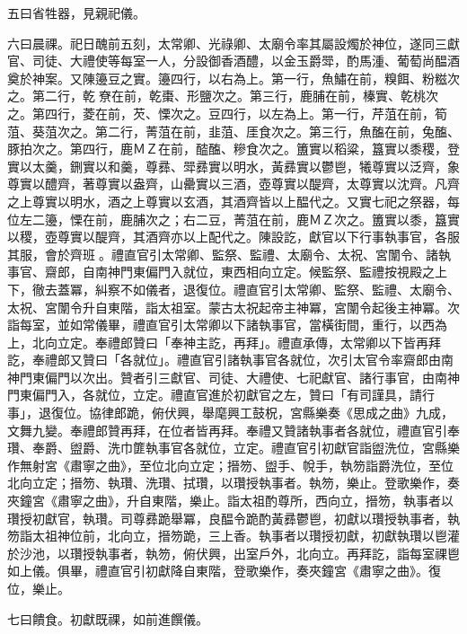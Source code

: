 \begin{pinyinscope}
 五曰省牲器，見親祀儀。



 六曰晨祼。祀日醜前五刻，太常卿、光祿卿、太廟令率其屬設燭於神位，遂同三獻官、司徒、大禮使等每室一人，分設御香酒醴，以金玉爵斝，酌馬湩、葡萄尚醖酒奠於神案。又陳籩豆之實。籩四行，以右為上。第一行，魚鱐在前，糗餌、粉糍次之。第二行，乾尞在前，乾棗、形鹽次之。第三行，鹿脯在前，榛實、乾桃次之。第四行，菱在前，芡、慄次之。豆四行，以左為上。第一行，芹菹在前，筍菹、葵菹次之。第二行，菁菹在前，韭菹、厓食次之。第三行，魚醢在前，兔醢、豚拍次之。第四行，鹿ＭＺ在前，醓醢、糝食次之。簠實以稻粱，簋實以黍稷，登實以太羹，鉶實以和羹，尊彞、斝彞實以明水，黃彞實以鬱鬯，犧尊實以泛齊，象尊實以醴齊，著尊實以盎齊，山罍實以三酒，壺尊實以醍齊，太尊實以沈齊。凡齊之上尊實以明水，酒之上尊實以玄酒，其酒齊皆以上醖代之。又實七祀之祭器，每位左二籩，慄在前，鹿脯次之；右二豆，菁菹在前，鹿ＭＺ次之。簠實以黍，簋實以稷，壺尊實以醍齊，其酒齊亦以上配代之。陳設訖，獻官以下行事執事官，各服其服，會於齊班。禮直官引太常卿、監祭、監禮、太廟令、太祝、宮闈令、諸執事官、齋郎，自南神門東偏門入就位，東西相向立定。候監祭、監禮按視殿之上下，徹去蓋冪，糾察不如儀者，退復位。禮直官引太常卿、監祭、監禮、太廟令、太祝、宮闈令升自東階，詣太祖室。蒙古太祝起帝主神冪，宮闈令起後主神冪。次詣每室，並如常儀畢，禮直官引太常卿以下諸執事官，當橫街間，重行，以西為上，北向立定。奉禮郎贊曰「奉神主訖，再拜」。禮直承傳，太常卿以下皆再拜訖，奉禮郎又贊曰「各就位」。禮直官引諸執事官各就位，次引太官令率齋郎由南神門東偏門以次出。贊者引三獻官、司徒、大禮使、七祀獻官、諸行事官，由南神門東偏門入，各就位，立定。禮直官進於初獻官之左，贊曰「有司謹具，請行事」，退復位。協律郎跪，俯伏興，舉麾興工鼓柷，宮縣樂奏《思成之曲》九成，文舞九變。奉禮郎贊再拜，在位者皆再拜。奉禮又贊諸執事者各就位，禮直官引奉瓚、奉爵、盥爵、洗巾篚執事官各就位，立定。禮直官引初獻官詣盥洗位，宮縣樂作無射宮《肅寧之曲》，至位北向立定；搢笏、盥手、帨手，執笏詣爵洗位，至位北向立定；搢笏、執瓚、洗瓚、拭瓚，以瓚授執事者。執笏，樂止。登歌樂作，奏夾鐘宮《肅寧之曲》，升自東階，樂止。詣太祖酌尊所，西向立，搢笏，執事者以瓚授初獻官，執瓚。司尊彞跪舉冪，良醖令跪酌黃彞鬱鬯，初獻以瓚授執事者，執笏詣太祖神位前，北向立，搢笏跪，三上香。執事者以瓚授初獻，初獻執瓚以鬯灌於沙池，以瓚授執事者，執笏，俯伏興，出室戶外，北向立。再拜訖，詣每室祼鬯如上儀。俱畢，禮直官引初獻降自東階，登歌樂作，奏夾鐘宮《肅寧之曲》。復位，樂止。



 七曰饋食。初獻既祼，如前進饌儀。




\end{pinyinscope}
